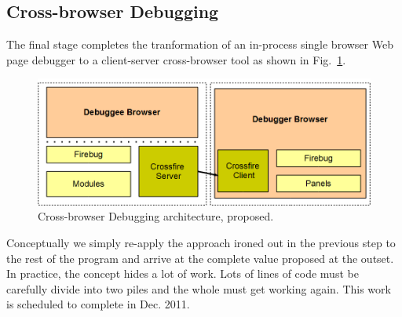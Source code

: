 \subsection{Cross-browser Debugging}
The final stage completes the tranformation of an in-process single browser Web page debugger to a client-server 
cross-browser tool as shown in Fig.~\ref{fig:crossbrowser}.  
\begin{figure}[htp]
  \includegraphics  [width = 86 mm] {figures/crossbrowser.png}
  \caption{Cross-browser Debugging architecture, proposed.}
 \label{fig:crossbrowser}
\end{figure}
Conceptually we simply re-apply the approach ironed out in the previous step to the rest of the 
program and arrive at the complete value proposed at the outset. In practice, the concept hides a lot of work. Lots of lines of code 
must be carefully divide into two piles and the whole must get working again. This work is scheduled to complete in Dec. 2011.






















